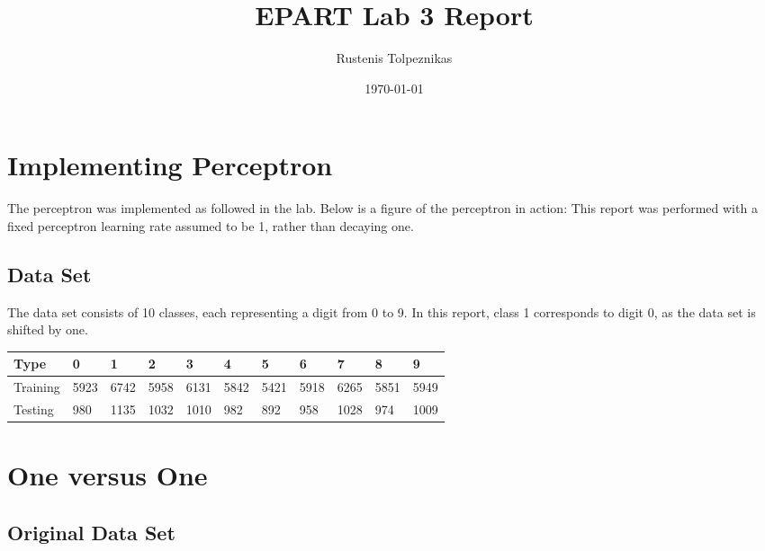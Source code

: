 \documentclass[
  a4paper,            %
  DIV=10,             %
  oneside,            %
  BCOR=5mm,           %
  parskip=half,       %
  numbers=noenddot,   %
  bibtotoc,           %
  listof=totoc,        %
  article
]{scrreprt}
\title{EPART Lab 3 Report}
\author{Rustenis Tolpeznikas}
\date{\today}
\begin{document}
\maketitle
\newpage

\section{Implementing Perceptron}
The perceptron was implemented as followed in the lab.
Below is a figure of the perceptron in action:
This report was performed with a fixed perceptron learning rate assumed to be 1, rather than decaying one.
\subsection{Data Set}
The data set consists of 10 classes, each representing a digit from 0 to 9.
In this report, class 1 corresponds to digit 0, as the data set is shifted by one.
\begin{center}
  \begin{tabular}{|p{2cm}|p{1cm}|p{1cm}|p{1cm}|p{1cm}|p{1cm}|p{1cm}|p{1cm}|p{1cm}|p{1cm}|p{1cm}|}
    \hline
    \textbf{Type} & \textbf{0} & \textbf{1} & \textbf{2} & \textbf{3} & \textbf{4} & \textbf{5} & \textbf{6} & \textbf{7} & \textbf{8} & \textbf{9} \\
    \hline
    Training & 5923 & 6742&5958&6131&5842&5421&5918&6265&5851&5949 \\
    \hline
    Testing &980&1135&1032&1010&982&892&958&1028&974&1009 \\
    \hline
  \end{tabular}
\end{center}

\section{One versus One}
\subsection{Original Data Set}
\end{document}
